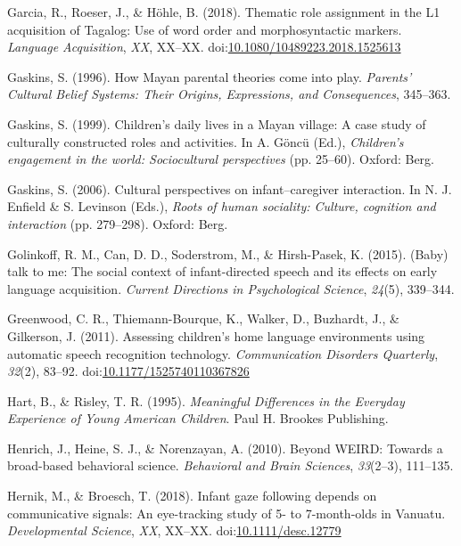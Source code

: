 \documentclass[floatsintext,man]{apa6}
\theoremstyle{definition}
\theoremstyle{definition}
\theoremstyle{definition}
\theoremstyle{remark}
\begin{document}
\hypertarget{ref-garcia2018thematic}{}
Garcia, R., Roeser, J., \& Höhle, B. (2018). Thematic role assignment in
the L1 acquisition of Tagalog: Use of word order and morphosyntactic
markers. \emph{Language Acquisition}, \emph{XX}, XX--XX.
doi:\href{https://doi.org/10.1080/10489223.2018.1525613}{10.1080/10489223.2018.1525613}

\hypertarget{ref-gaskins1996how}{}
Gaskins, S. (1996). How Mayan parental theories come into play.
\emph{Parents' Cultural Belief Systems: Their Origins, Expressions, and
Consequences}, 345--363.

\hypertarget{ref-gaskins1999childrens}{}
Gaskins, S. (1999). Children's daily lives in a Mayan village: A case
study of culturally constructed roles and activities. In A. Göncü (Ed.),
\emph{Children's engagement in the world: Sociocultural perspectives}
(pp. 25--60). Oxford: Berg.

\hypertarget{ref-gaskins2006cultural}{}
Gaskins, S. (2006). Cultural perspectives on infant--caregiver
interaction. In N. J. Enfield \& S. Levinson (Eds.), \emph{Roots of
human sociality: Culture, cognition and interaction} (pp. 279--298).
Oxford: Berg.

\hypertarget{ref-golinkoff2015baby}{}
Golinkoff, R. M., Can, D. D., Soderstrom, M., \& Hirsh-Pasek, K. (2015).
(Baby) talk to me: The social context of infant-directed speech and its
effects on early language acquisition. \emph{Current Directions in
Psychological Science}, \emph{24}(5), 339--344.

\hypertarget{ref-greenwood2011assessing}{}
Greenwood, C. R., Thiemann-Bourque, K., Walker, D., Buzhardt, J., \&
Gilkerson, J. (2011). Assessing children's home language environments
using automatic speech recognition technology. \emph{Communication
Disorders Quarterly}, \emph{32}(2), 83--92.
doi:\href{https://doi.org/10.1177/1525740110367826}{10.1177/1525740110367826}

\hypertarget{ref-hart1995meaningful}{}
Hart, B., \& Risley, T. R. (1995). \emph{Meaningful Differences in the
Everyday Experience of Young American Children}. Paul H. Brookes
Publishing.

\hypertarget{ref-henrich2010beyond}{}
Henrich, J., Heine, S. J., \& Norenzayan, A. (2010). Beyond WEIRD:
Towards a broad-based behavioral science. \emph{Behavioral and Brain
Sciences}, \emph{33}(2--3), 111--135.

\hypertarget{ref-hernik2018infant}{}
Hernik, M., \& Broesch, T. (2018). Infant gaze following depends on
communicative signals: An eye-tracking study of 5- to 7-month-olds in
Vanuatu. \emph{Developmental Science}, \emph{XX}, XX--XX.
doi:\href{https://doi.org/10.1111/desc.12779}{10.1111/desc.12779}
\end{document}
